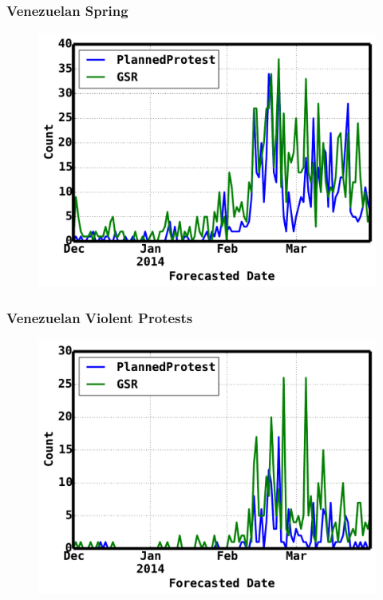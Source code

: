 \documentclass[red]{beamer}
\begin{document}
\begin{frame}
     \frametitle{Venezuelan Spring}
     \begin{figure}
        \centering
        \includegraphics[scale=0.4]{venezuela}
     \end{figure}
\end{frame}

\begin{frame}
    \frametitle{Venezuelan Violent Protests}
     \begin{figure}
        \centering
        \includegraphics[scale=0.4]{venezuela_violent}
     \end{figure}
\end{frame}
\end{document}
